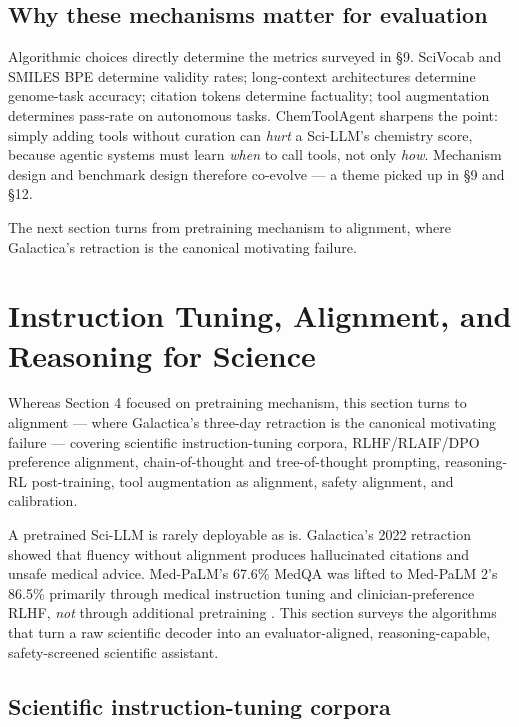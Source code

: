 \documentclass{article}
\begin{document}
\subsection{Why these mechanisms matter for evaluation}\label{why-these-mechanisms-matter-for-evaluation}

Algorithmic choices directly determine the metrics surveyed in §9. SciVocab and SMILES BPE determine validity rates; long-context architectures determine genome-task accuracy; citation tokens determine factuality; tool augmentation determines pass-rate on autonomous tasks. ChemToolAgent \cite{yu2024chemtoolagenttheim} sharpens the point: simply adding tools without curation can \emph{hurt} a Sci-LLM's chemistry score, because agentic systems must learn \emph{when} to call tools, not only \emph{how}. Mechanism design and benchmark design therefore co-evolve --- a theme picked up in §9 and §12.

The next section turns from pretraining mechanism to alignment, where Galactica's retraction is the canonical motivating failure.

\section{Instruction Tuning, Alignment, and Reasoning for Science}\label{instruction-tuning-alignment-and-reasoning-for-science}

Whereas Section 4 focused on pretraining mechanism, this section turns to alignment --- where Galactica's three-day retraction is the canonical motivating failure --- covering scientific instruction-tuning corpora, RLHF/RLAIF/DPO preference alignment, chain-of-thought and tree-of-thought prompting, reasoning-RL post-training, tool augmentation as alignment, safety alignment, and calibration.

A pretrained Sci-LLM is rarely deployable as is. Galactica's 2022 retraction \cite{taylor2022arxiv2211090852022} showed that fluency without alignment produces hallucinated citations and unsafe medical advice. Med-PaLM's 67.6\% MedQA was lifted to Med-PaLM 2's 86.5\% primarily through medical instruction tuning and clinician-preference RLHF, \emph{not} through additional pretraining \cite{singhal2025towardexpertlevelm,singhal2023largelanguagemodel}. This section surveys the algorithms that turn a raw scientific decoder into an evaluator-aligned, reasoning-capable, safety-screened scientific assistant.

\subsection{Scientific instruction-tuning corpora}\label{scientific-instruction-tuning-corpora}
\end{document}
